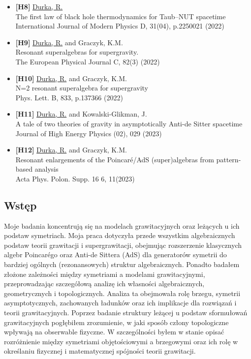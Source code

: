 \documentclass[12pt,a4paper]{article}
\begin{document}
\begin{itemize}
	\item{\textbf{[H8]}} \underline{Durka, R.}\\ The first law of black hole thermodynamics for Taub–NUT spacetime\\ International Journal of Modern Physics D, 31(04), p.2250021 (2022)
	
	\item{\textbf{[H9]}} \underline{Durka, R.} and Graczyk, K.M.\\ Resonant superalgebras for supergravity. \\The European Physical Journal C, 82(3) (2022)
	
	\item{\textbf{[H10]}} \underline{Durka, R.} and Graczyk, K.M.\\ N=2 resonant superalgebra for supergravity\\ Phys. Lett. B, 833, p.137366 (2022)
	
	\item{\textbf{[H11]}} \underline{Durka, R.} and Kowalski-Glikman, J.\\ A tale of two theories of gravity in asymptotically Anti-de Sitter spacetime\\ Journal of High Energy Physics (02), 029 (2023)
	
	\item{\textbf{[H12]}} \underline{Durka, R.} and Graczyk, K.M.\\ Resonant enlargements of the Poincar\'{e}/AdS (super)algebras from pattern-based analysis\\ Acta Phys. Polon. Supp. 16 6, 11(2023) 
\end{itemize}	
\newpage

\subsection{Wstęp}

Moje badania koncentrują się na modelach grawitacyjnych oraz leżących u ich podstaw symetriach. Moja praca dotyczyła przede wszystkim algebraicznych podstaw teorii grawitacji i supergrawitacji, obejmując rozszerzenie klasycznych algebr Poincarégo oraz Anti-de Sittera (AdS) dla generatorów symetrii do bardziej ogólnych (rezonansowych) struktur algebraicznych. Ponadto badałem złożone zależności między symetriami a modelami grawitacyjnymi, przeprowadzając szczegółową analizę ich własności algebraicznych, geometrycznych i topologicznych. Analiza ta obejmowała rolę brzegu, symetrii asymptotycznych, zachowanych ładunków oraz ich implikacje dla rozwiązań i teorii grawitacyjnych. Poprzez badanie struktury leżącej u podstaw sformułowań grawitacyjnych pogłębiłem zrozumienie, w jaki sposób człony topologiczne wpływają na obserwable fizyczne. W szczególności byłem w stanie opisać rozróżnienie między symetriami objętościowymi a brzegowymi oraz ich rolę w określaniu fizycznej i matematycznej spójności teorii grawitacji.
\end{document}
